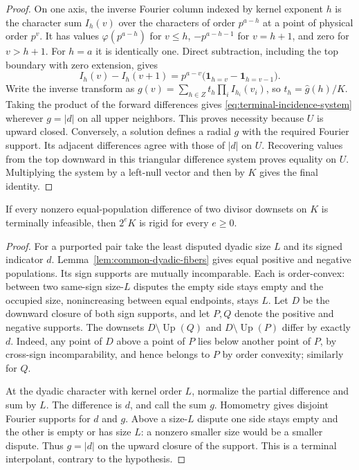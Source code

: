 \begin{proof}
On one axis, the inverse Fourier column indexed by kernel exponent
\(h\) is the character sum \(I_h(v)\) over the characters of order
\(p^{a-h}\) at a point of physical order \(p^v\). It has values
\(\varphi(p^{a-h})\) for \(v\le h\),
\(-p^{a-h-1}\) for \(v=h+1\), and zero for \(v>h+1\).
For \(h=a\) it is identically one. Direct subtraction, including
the top boundary with zero extension, gives
\[
I_h(v)-I_h(v+1)
=p^{a-v}\bigl(\mathbf1_{h=v}-\mathbf1_{h=v-1}\bigr).
\]
Write the inverse transform as
\(g(v)=\sum_{h\in Z}t_h\prod_i I_{h_i}(v_i)\), so
\(t_h=\widehat g(h)/K\). Taking the product of the forward
differences gives \eqref{eq:terminal-incidence-system} wherever
\(g=|d|\) on all upper neighbors. This proves necessity because
\(U\) is upward closed. Conversely, a solution defines a radial
\(g\) with the required Fourier support. Its adjacent differences
agree with those of \(|d|\) on \(U\). Recovering values from the
top downward in this triangular difference system proves equality on
\(U\). Multiplying the system by a left-null vector and then by
\(K\) gives the final identity.
\end{proof}

\begin{lemma}
\label{lem:terminal-implies-rigidity}
If every nonzero equal-population difference of two divisor downsets
on \(K\) is terminally infeasible, then \(2^eK\) is rigid for
every \(e\ge0\).
\end{lemma}

\begin{proof}
For a purported pair take the least disputed dyadic size \(L\) and
its signed indicator \(d\). Lemma~\ref{lem:common-dyadic-fibers}
gives equal positive and negative populations. Its sign supports are
mutually incomparable. Each is order-convex: between two same-sign
size-\(L\) disputes the empty side stays empty and the occupied
size, nonincreasing between equal endpoints, stays \(L\).
Let \(D\) be the downward closure of both sign supports, and let
\(P,Q\) denote the positive and negative supports. The downsets
\(D\setminus\operatorname{Up}(Q)\) and
\(D\setminus\operatorname{Up}(P)\) differ by exactly \(d\).
Indeed, any point of \(D\) above a point of \(P\) lies below
another point of \(P\), by cross-sign incomparability, and hence
belongs to \(P\) by order convexity; similarly for \(Q\).

At the dyadic character with kernel order \(L\), normalize the
partial difference and sum by \(L\). The difference is \(d\),
and call the sum \(g\). Homometry gives disjoint Fourier supports
for \(d\) and \(g\). Above a size-\(L\) dispute one side stays
empty and the other is empty or has size \(L\): a nonzero smaller
size would be a smaller dispute. Thus \(g=|d|\) on the upward
closure of the support. This is a terminal interpolant, contrary to
the hypothesis.
\end{proof}

